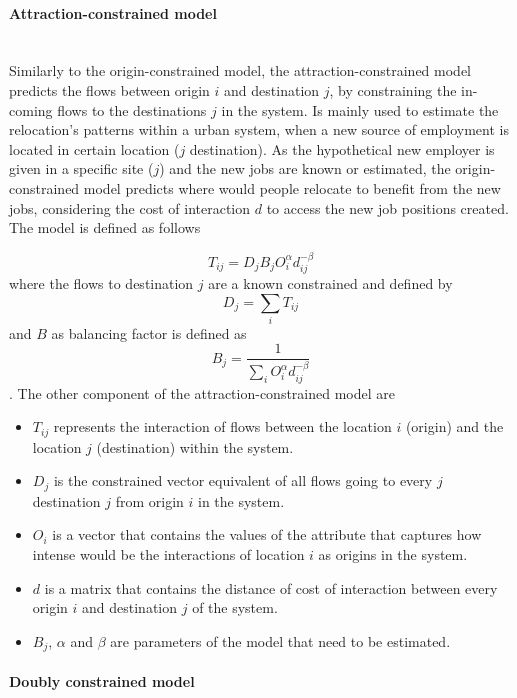 \documentclass{article}
\begin{document}
\paragraph{Attraction-constrained model}\mbox{}\\

Similarly to the origin-constrained model, the attraction-constrained model predicts the flows between origin $i$ and destination $j$, by constraining the in-coming flows to the destinations $j$ in the system. Is mainly used to estimate the relocation's patterns within a urban system, when a new source of employment is located in certain location ($j$ destination). As the hypothetical new employer is given in a specific site ($j$) and the new jobs are known or estimated, the origin-constrained model predicts where would people relocate to benefit from the new jobs, considering the  cost of interaction $d$ to access the new job positions created. The model is defined as follows

\[T_{ij} = D_j B_j O_i^\alpha d_{ij}^{-\beta}\] where the flows to destination $j$ are a known constrained and defined by \[D_j = \sum_i T_{ij}\] and $B$ as balancing factor is defined as \[B_j = \frac{1}{\sum_i O_i^\alpha d_{ij}^{-\beta}}\]. The other component of the attraction-constrained model are

\begin{itemize}
  \item $T_{ij}$ represents the interaction of flows between the location $i$ (origin) and the location $j$ (destination) within the system. 
  \item $D_{j}$ is the constrained vector equivalent of all flows going to every $j$ destination $j$ from origin $i$ in the system.
  \item $O_{i}$ is a vector that contains the values of the attribute that captures how intense would be the interactions of location $i$ as origins in the system.
    \item $d$ is a matrix that contains the distance of cost of interaction between every origin $i$ and destination $j$ of the system.
    \item $B_{j}$, $\alpha$  and $\beta$ are parameters of the model that need to be estimated.
\end{itemize}


\paragraph{Doubly constrained model}\mbox{}\\
\end{document}
